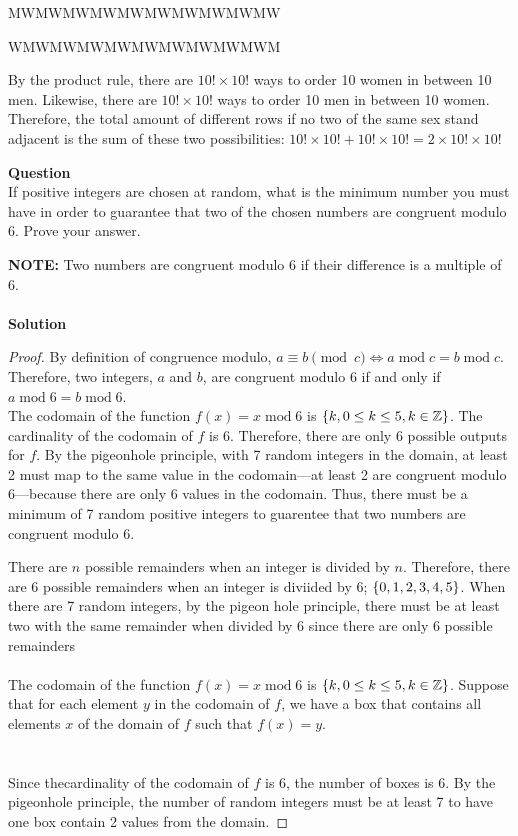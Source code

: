 \documentclass[article,12pt]{article}
\newcounter{question}
\def\questionnum{{\Large\bfseries{Question \arabic{question} }}\\[1em]}
\newcommand{\question}{
    \stepcounter{question}
    \questionnum
}
\newcommand{\solution}{
    {{\large\bfseries{Solution}}}
}
\newcommand{\Mod}[1]{\;\mathrm{mod}\; #1} %
\DeclarePairedDelimiter\set{\{}{\}}
\newcommand{\ints}{\mathbb{Z}}
\begin{document}
\begin{center}
    MWMWMWMWMWMWMWMWMWMW
\end{center}
\begin{center}
    WMWMWMWMWMWMWMWMWMWM
\end{center}
By the product rule, there are $10! \times 10!$ ways to order 10 women in between 10 men. Likewise, there are $10! \times 10!$ ways to order 10 men in between 10 women. Therefore, the total amount of different rows if no two of the same sex stand adjacent is the sum of these two possibilities: $10! \times 10! + 10! \times 10! = 2 \times 10! \times 10!$
\newpage
\question
If positive integers are chosen at random, what is the minimum number you must have in order to guarantee that two of the chosen numbers are congruent modulo 6.   Prove your answer. \par  {\bf NOTE:} Two numbers are congruent modulo 6 if their difference is a multiple of 6.\\
\\
\solution
\begin{proof}
    By definition of congruence modulo, $ a \equiv b \pmod{c} \iff a \Mod{c} = b \Mod{c}$. Therefore, two integers, $a$ and $b$, are congruent modulo 6 if and only if $a \Mod{6} = b \Mod{6}$. \\
    
    The codomain of the function $f(x) = x \Mod 6$ is $\set*{k, 0 \leq k \leq 5, k \in \ints}$. The cardinality of the codomain of $f$ is 6. Therefore, there are only 6 possible outputs for $f$. By the pigeonhole principle, with 7 random integers in the domain, at least 2 must map to the same value in the codomain---at least 2 are congruent modulo 6---because there are only 6 values in the codomain. Thus, there must be a minimum of 7 random positive integers to guarentee that two numbers are congruent modulo 6.

     There are $n$ possible remainders when an integer is divided by $n$. Therefore, there are 6 possible remainders when an integer is diviided by 6; $\set*{0,1,2,3,4,5}$. When there are 7 random integers, by the pigeon hole principle, there must be at least two with the same remainder when divided by 6 since there are only 6 possible remainders
\\
\\
    The codomain of the function $f(x) = x \Mod 6$ is $\set*{k, 0 \leq k \leq 5, k \in \ints}$. Suppose that for each element $y$ in the codomain of $f$, we have a box that contains all elements $x$ of the domain of $f$ such that $f(x)=y$. \\
    \\
    \\
    Since thecardinality of the codomain of $f$ is 6, the number of boxes is 6. By the pigeonhole principle, the number of random integers must be at least 7 to have one box contain 2 values from the domain.
\end{proof}
\end{document}
